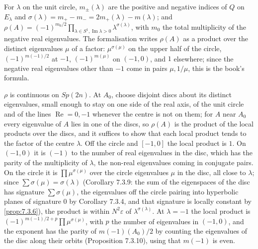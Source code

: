 \begin{proposition}
  \label{prop:7.3.5}
  \leanok
  For $\lambda$ on the unit circle, $m_\pm(\lambda)$ are the positive and
  negative indices of $Q$ on $E_\lambda$ and $\sigma(\lambda) = m_+ - m_- =
  2m_+(\lambda) - m(\lambda)$; and
  $\rho(A) = (-1)^{m_0/2} \prod_{\lambda \in S^1, \operatorname{Im}\lambda > 0}
  \lambda^{\sigma(\lambda)}$, with $m_0$ the total multiplicity of the negative
  real eigenvalues.  The formalisation writes $\rho(A)$ as a product over the
  distinct eigenvalues $\mu$ of a factor: $\mu^{\sigma(\mu)}$ on the upper half
  of the circle, $(-1)^{m(-1)/2}$ at $-1$, $(-1)^{m(\mu)}$ on $(-1, 0)$, and
  $1$ elsewhere; since the negative real eigenvalues other than $-1$ come in
  pairs $\mu, 1/\mu$, this is the book's formula.
\end{proposition}

\begin{theorem}
  \label{thm:rho-continuous}
  \leanok
  $\rho$ is continuous on $Sp(2n)$.  At $A_0$, choose disjoint discs about its
  distinct eigenvalues, small enough to stay on one side of the real axis, of
  the unit circle and of the lines $\operatorname{Re} = 0, -1$ whenever the
  centre is not on them; for $A$ near $A_0$ every eigenvalue of $A$ lies in one
  of the discs, so $\rho(A)$ is the product of the local products over the
  discs, and it suffices to show that each local product tends to the factor
  of the centre $\lambda$.  Off the circle and $[-1, 0]$ the local product is
  $1$.  On $(-1, 0)$ it is $(-1)$ to the number of real eigenvalues in the
  disc, which has the parity of the multiplicity of $\lambda$, the non-real
  eigenvalues coming in conjugate pairs.  On the circle it is
  $\prod \mu^{\sigma(\mu)}$ over the circle eigenvalues $\mu$ in the disc, all
  close to $\lambda$; since $\sum \sigma(\mu) = \sigma(\lambda)$ (Corollary
  7.3.9: the sum of the eigenspaces of the disc has signature $\sum\sigma(\mu)$,
  the eigenvalues off the circle pairing into hyperbolic planes of signature
  $0$ by Corollary 7.3.4, and that signature is locally constant by
  \ref{prop:7.3.6}), the product is within $N^2 \varepsilon$ of
  $\lambda^{\sigma(\lambda)}$.  At $\lambda = -1$ the local product is
  $(-1)^{m(-1)/2 + p}\prod \mu^{\sigma(\mu)}$, with $p$ the number of
  eigenvalues in $(-1, 0)$, and the exponent has the parity of $m(-1)(A_0)/2$
  by counting the eigenvalues of the disc along their orbits (Proposition
  7.3.10), using that $m(-1)$ is even.
\end{theorem}

